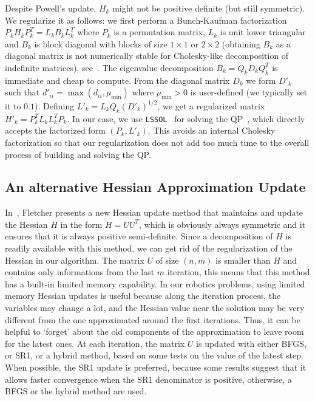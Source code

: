 Despite Powell's update, $H_{k}$ might not be positive definite (but still symmetric).
We regularize it as follows: we first perform a Bunch-Kaufman factorization $P_k H_k P_k^T= L_k B_k L_k^T$ where $P_k$ is a permutation matrix, $L_k$ is unit lower triangular and $B_k$ is block diagonal with blocks of size $1 \times 1$ or $2\times 2$ (obtaining $B_k$ as a diagonal matrix is not numerically stable for Cholesky-like decomposition of indefinite matrices), see~\cite{golub:book:1996}.
The eigenvalue decomposition $B_k = Q_k D_k Q_k^T$ is immediate and cheap to compute.
From the diagonal matrix $D_k$ we form $D'_k$ such that $d'_{ii} = \max\left(d_{ii},\mu_{\min}\right)$ where $\mu_{\min}>0$ is user-defined (we typically set it to $0.1$).
Defining $L'_k = L_k Q_k {(D'_k)}^{1/2}$, we get a regularized matrix $H'_k = P_k^T L_k L_k^T P_k$.
In our case, we use {\tt LSSOL}~\cite{gill:techrep:1986} for solving the QP~, which directly accepts the factorized form $(P_k, L'_k)$.
This avoids an internal Cholesky factorization so that our regularization does not add too much time to the overall process of building and solving the QP.\@

\subsection{An alternative Hessian Approximation Update}
\label{sub:an_alternative_hessian_approximation_update}

In~\cite{Fletcher:ifip:2006}, Fletcher presents a new Hessian update method that maintains and update the Hessian $H$ in the form $H=U U^T$, which is obviously always symmetric and it ensures that it is always positive semi-definite.
Since a decomposition of $H$ is readily available with this method, we can get rid of the regularization of the Hessian in our algorithm.
The matrix $U$ of size $(n,m)$ is smaller than $H$ and contains only informations from the last $m$ iteration, this means that this method has a built-in limited memory capability.
In our robotics problems, using limited memory Hessian updates is useful because along the iteration process, the variables may change a lot, and the Hessian value near the solution may be very different from the one approximated around the first iterations.
Thus, it can be helpful to `forget' about the old components of the approximation to leave room for the latest ones.
At each iteration, the matrix $U$ is updated with either BFGS, or SR1, or a hybrid method, based on some tests on the value of the latest step.
When possible, the SR1 update is preferred, because some results suggest that it allows faster convergence when the SR1 denominator is positive, otherwise, a BFGS or the hybrid method are used.

